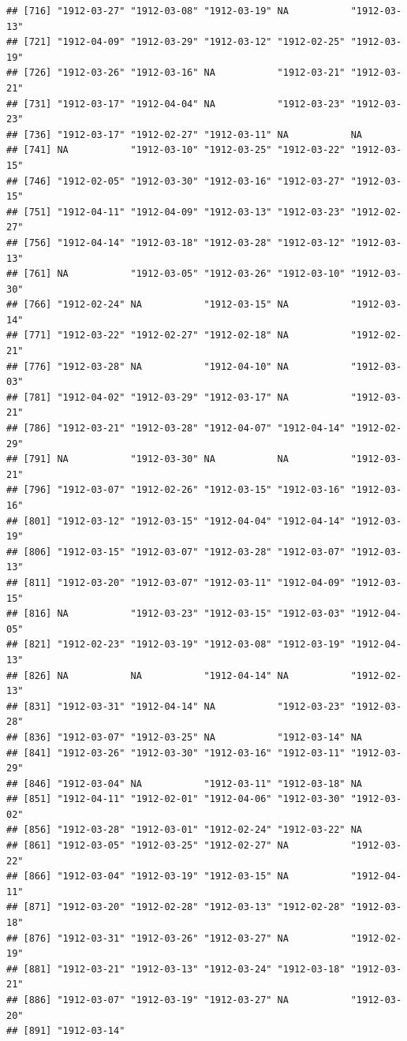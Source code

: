 \documentclass[11pt,]{book}
\begin{document}
\begin{verbatim}
## [716] "1912-03-27" "1912-03-08" "1912-03-19" NA           "1912-03-13"
## [721] "1912-04-09" "1912-03-29" "1912-03-12" "1912-02-25" "1912-03-19"
## [726] "1912-03-26" "1912-03-16" NA           "1912-03-21" "1912-03-21"
## [731] "1912-03-17" "1912-04-04" NA           "1912-03-23" "1912-03-23"
## [736] "1912-03-17" "1912-02-27" "1912-03-11" NA           NA          
## [741] NA           "1912-03-10" "1912-03-25" "1912-03-22" "1912-03-15"
## [746] "1912-02-05" "1912-03-30" "1912-03-16" "1912-03-27" "1912-03-15"
## [751] "1912-04-11" "1912-04-09" "1912-03-13" "1912-03-23" "1912-02-27"
## [756] "1912-04-14" "1912-03-18" "1912-03-28" "1912-03-12" "1912-03-13"
## [761] NA           "1912-03-05" "1912-03-26" "1912-03-10" "1912-03-30"
## [766] "1912-02-24" NA           "1912-03-15" NA           "1912-03-14"
## [771] "1912-03-22" "1912-02-27" "1912-02-18" NA           "1912-02-21"
## [776] "1912-03-28" NA           "1912-04-10" NA           "1912-03-03"
## [781] "1912-04-02" "1912-03-29" "1912-03-17" NA           "1912-03-21"
## [786] "1912-03-21" "1912-03-28" "1912-04-07" "1912-04-14" "1912-02-29"
## [791] NA           "1912-03-30" NA           NA           "1912-03-21"
## [796] "1912-03-07" "1912-02-26" "1912-03-15" "1912-03-16" "1912-03-16"
## [801] "1912-03-12" "1912-03-15" "1912-04-04" "1912-04-14" "1912-03-19"
## [806] "1912-03-15" "1912-03-07" "1912-03-28" "1912-03-07" "1912-03-13"
## [811] "1912-03-20" "1912-03-07" "1912-03-11" "1912-04-09" "1912-03-15"
## [816] NA           "1912-03-23" "1912-03-15" "1912-03-03" "1912-04-05"
## [821] "1912-02-23" "1912-03-19" "1912-03-08" "1912-03-19" "1912-04-13"
## [826] NA           NA           "1912-04-14" NA           "1912-02-13"
## [831] "1912-03-31" "1912-04-14" NA           "1912-03-23" "1912-03-28"
## [836] "1912-03-07" "1912-03-25" NA           "1912-03-14" NA          
## [841] "1912-03-26" "1912-03-30" "1912-03-16" "1912-03-11" "1912-03-29"
## [846] "1912-03-04" NA           "1912-03-11" "1912-03-18" NA          
## [851] "1912-04-11" "1912-02-01" "1912-04-06" "1912-03-30" "1912-03-02"
## [856] "1912-03-28" "1912-03-01" "1912-02-24" "1912-03-22" NA          
## [861] "1912-03-05" "1912-03-25" "1912-02-27" NA           "1912-03-22"
## [866] "1912-03-04" "1912-03-19" "1912-03-15" NA           "1912-04-11"
## [871] "1912-03-20" "1912-02-28" "1912-03-13" "1912-02-28" "1912-03-18"
## [876] "1912-03-31" "1912-03-26" "1912-03-27" NA           "1912-02-19"
## [881] "1912-03-21" "1912-03-13" "1912-03-24" "1912-03-18" "1912-03-21"
## [886] "1912-03-07" "1912-03-19" "1912-03-27" NA           "1912-03-20"
## [891] "1912-03-14"
\end{verbatim}
\end{document}
